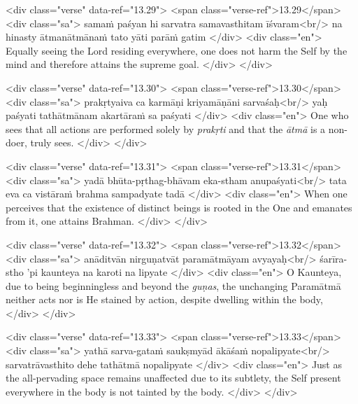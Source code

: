 \begin{html}
<div class="verse" data-ref="13.29">
  <span class="verse-ref">13.29</span>
  <div class="sa">
    samaṁ paśyan hi sarvatra samavasthitam īśvaram<br/>
    na hinasty ātmanātmānaṁ tato yāti parāṁ gatim
  </div>
  <div class="en">
    Equally seeing the Lord residing everywhere, one does not harm the Self by the mind and therefore attains the supreme goal.
  </div>
</div>
\end{html}



\begin{html}
<div class="verse" data-ref="13.30">
  <span class="verse-ref">13.30</span>
  <div class="sa">
    prakṛtyaiva ca karmāṇi kriyamāṇāni sarvaśaḥ<br/>
    yaḥ paśyati tathātmānam akartāraṁ sa paśyati
  </div>
  <div class="en">
    One who sees that all actions are performed solely by \textit{prakṛti} and that the \textit{ātmā} is a non-doer, truly sees.
  </div>
</div>
\end{html}



\begin{html}
<div class="verse" data-ref="13.31">
  <span class="verse-ref">13.31</span>
  <div class="sa">
    yadā bhūta-pṛthag-bhāvam eka-stham anupaśyati<br/>
    tata eva ca vistāraṁ brahma sampadyate tadā
  </div>
  <div class="en">
    When one perceives that the existence of distinct beings is rooted in the One and emanates from it, one attains Brahman.
  </div>
</div>
\end{html}



\begin{html}
<div class="verse" data-ref="13.32">
  <span class="verse-ref">13.32</span>
  <div class="sa">
    anāditvān nirguṇatvāt paramātmāyam avyayaḥ<br/>
    śarīra-stho ’pi kaunteya na karoti na lipyate
  </div>
  <div class="en">
    O Kaunteya, due to being beginningless and beyond the \textit{guṇas}, the unchanging Paramātmā neither acts nor is He stained by action, despite dwelling within the body,
  </div>
</div>
\end{html}



\begin{html}
<div class="verse" data-ref="13.33">
  <span class="verse-ref">13.33</span>
  <div class="sa">
    yathā sarva-gataṁ saukṣmyād ākāśaṁ nopalipyate<br/>
    sarvatrāvasthito dehe tathātmā nopalipyate
  </div>
  <div class="en">
    Just as the all-pervading space remains unaffected due to its subtlety, the Self present everywhere in the body is not tainted by the body.
  </div>
</div>
\end{html}



